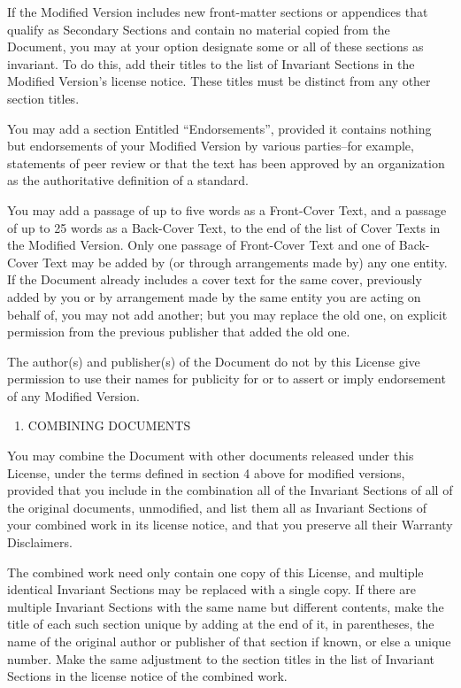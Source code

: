 \documentclass[12pt,a4paperpaper,]{report}
\providecommand{\tightlist}{%
  \setlength{\itemsep}{0pt}\setlength{\parskip}{0pt}}
\begin{document}
If the Modified Version includes new front-matter sections or appendices
that qualify as Secondary Sections and contain no material copied from
the Document, you may at your option designate some or all of these
sections as invariant. To do this, add their titles to the list of
Invariant Sections in the Modified Version's license notice. These
titles must be distinct from any other section titles.

You may add a section Entitled ``Endorsements'', provided it contains
nothing but endorsements of your Modified Version by various
parties--for example, statements of peer review or that the text has
been approved by an organization as the authoritative definition of a
standard.

You may add a passage of up to five words as a Front-Cover Text, and a
passage of up to 25 words as a Back-Cover Text, to the end of the list
of Cover Texts in the Modified Version. Only one passage of Front-Cover
Text and one of Back-Cover Text may be added by (or through arrangements
made by) any one entity. If the Document already includes a cover text
for the same cover, previously added by you or by arrangement made by
the same entity you are acting on behalf of, you may not add another;
but you may replace the old one, on explicit permission from the
previous publisher that added the old one.

The author(s) and publisher(s) of the Document do not by this License
give permission to use their names for publicity for or to assert or
imply endorsement of any Modified Version.

\begin{enumerate}
\def\labelenumi{\arabic{enumi}.}
\setcounter{enumi}{4}
\tightlist
\item
  COMBINING DOCUMENTS
\end{enumerate}

You may combine the Document with other documents released under this
License, under the terms defined in section 4 above for modified
versions, provided that you include in the combination all of the
Invariant Sections of all of the original documents, unmodified, and
list them all as Invariant Sections of your combined work in its license
notice, and that you preserve all their Warranty Disclaimers.

The combined work need only contain one copy of this License, and
multiple identical Invariant Sections may be replaced with a single
copy. If there are multiple Invariant Sections with the same name but
different contents, make the title of each such section unique by adding
at the end of it, in parentheses, the name of the original author or
publisher of that section if known, or else a unique number. Make the
same adjustment to the section titles in the list of Invariant Sections
in the license notice of the combined work.
\end{document}
